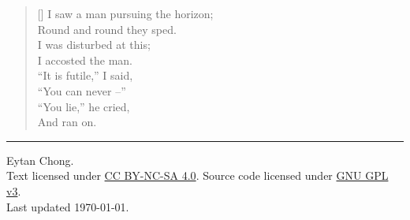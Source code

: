 \begin{titlepage}
    \vspace*{\fill}
       
    \settowidth{\versewidth}{I saw a man pursuing the horizon;}
    \begin{verse}[\versewidth]
    I saw a man pursuing the horizon;\\
    Round and round they sped.\\
    I was disturbed at this;\\
    I accosted the man.\\
    ``It is futile,'' I said,\\
    ``You can never --''\\[\baselineskip]
    ``You lie,'' he cried,\\
    And ran on.\\
    \end{verse}

    \vspace*{\fill}
    \hrule
    \medbreak
    {\small
    \noindent {\copyright} {\the\year} Eytan Chong.\\
    \noindent Text licensed under \href{https://creativecommons.org/licenses/by-nc-sa/4.0/}{CC BY-NC-SA 4.0}. Source code licensed under \href{https://www.gnu.org/licenses/gpl-3.0-standalone.html}{GNU GPL v3}.\\[0.4cm]
    \noindent Last updated \today.
    }
\end{titlepage}